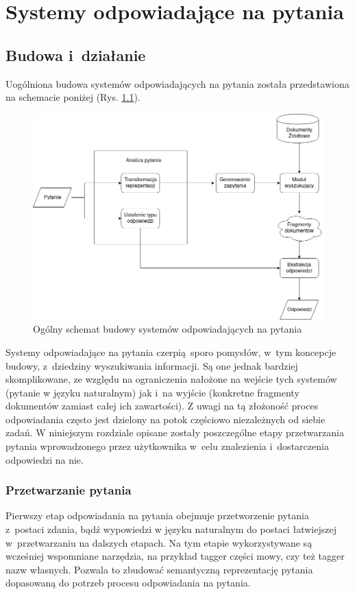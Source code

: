 \documentclass[a4paper, twoside, openright, 12pt]{report}
\begin{document}
\chapter{Systemy odpowiadające na pytania}
    \section{Budowa i~działanie}
        Uogólniona budowa systemów odpowiadających na pytania została przedstawiona na schemacie poniżej (Rys. \ref{QASCHEME})\cite{PASZKA}.
        \begin{figure}[h]
                \centering
                \includegraphics[scale=0.6, angle=90]{qa}
                \caption{Ogólny schemat budowy systemów odpowiadających na pytania}
                \label{QASCHEME}
        \end{figure}
        Systemy odpowiadające na pytania czerpią sporo pomysłów, w~tym koncepcje budowy, z~dziedziny wyszukiwania informacji.
        Są one jednak bardziej skomplikowane, ze względu na ograniczenia nałożone na wejście tych systemów (pytanie w
        języku naturalnym) jak i~na wyjście (konkretne fragmenty dokumentów zamiast całej ich zawartości). Z uwagi
        na tą złożoność proces odpowiadania często jest dzielony na potok częściowo niezależnych od siebie zadań.
        W niniejszym rozdziale opisane zostały poszczególne etapy przetwarzania pytania wprowadzonego przez użytkownika
        w~celu znalezienia i~dostarczenia odpowiedzi na nie.

        \subsection{Przetwarzanie pytania}
            Pierwszy etap odpowiadania na pytania obejmuje przetworzenie pytania z~postaci zdania, bądź wypowiedzi w
            języku naturalnym do postaci łatwiejszej w~przetwarzaniu na dalszych etapach. Na tym etapie wykorzystywane
            są wcześniej wspomniane narzędzia, na przykład tagger części mowy, czy też tagger nazw własnych. Pozwala
            to zbudować semantyczną reprezentację pytania dopasowaną do potrzeb procesu odpowiadania na pytania.
\end{document}
